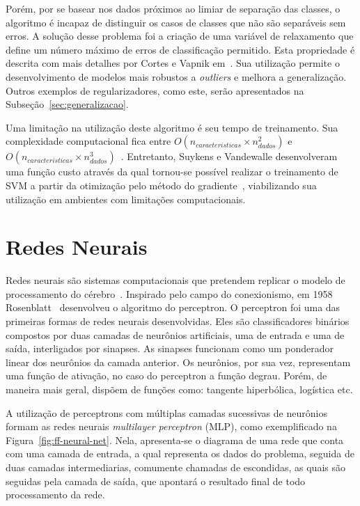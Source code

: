 Porém, por se basear nos dados próximos ao limiar de separação das classes, o algoritmo é incapaz de distinguir os casos
de classes que não são separáveis sem erros.
A solução desse problema foi a criação de uma variável de relaxamento que define um número máximo de erros de
classificação permitido.
Esta propriedade é descrita com mais detalhes por Cortes e Vapnik em~\cite{cortes95}.
Sua utilização permite o desenvolvimento de modelos mais robustos a \textit{outliers} e melhora a generalização.
Outros exemplos de regularizadores, como este, serão apresentados na Subseção~\ref{sec:generalizacao}.

Uma limitação na utilização deste algoritmo é seu tempo de treinamento.
Sua complexidade computacional fica entre $O(n_{caracteristicas} \times n_{dados}^2)$ e
$O(n_{caracteristicas} \times n_{dados}^3)$~\cite{list09}.
Entretanto, Suykens e Vandewalle desenvolveram uma função custo através da qual tornou-se possível realizar o treinamento
de SVM a partir da otimização pelo método do gradiente~\cite{suykens99}, viabilizando sua utilização em ambientes com
limitações computacionais.


\section{Redes Neurais} \label{sec:nn}

Redes neurais são sistemas computacionais que pretendem replicar o modelo de processamento do cérebro~\cite{wiener61}.
Inspirado pelo campo do conexionismo, em 1958 Rosenblatt~\cite{rosenblatt58} desenvolveu o algoritmo do perceptron.
O perceptron foi uma das primeiras formas de redes neurais desenvolvidas.
Eles são classificadores binários compostos por duas camadas de neurônios artificiais, uma de entrada e uma de saída,
interligados por sinapses.
As sinapses funcionam como um ponderador linear dos neurônios da camada anterior.
Os neurônios, por sua vez, representam uma função de ativação, no caso do perceptron a função degrau.
Porém, de maneira mais geral, dispõem de funções como: tangente hiperbólica, logística etc.

A utilização de perceptrons com múltiplas camadas sucessivas de neurônios formam as redes neurais
\textit{multilayer perceptron} (MLP), como exemplificado na Figura~\ref{fig:ff-neural-net}.
Nela, apresenta-se o diagrama de uma rede que conta com uma camada de entrada, a qual representa os dados do problema,
seguida de duas camadas intermediarias, comumente chamadas de escondidas, as quais são seguidas pela camada de saída,
que apontará o resultado final de todo processamento da rede.

